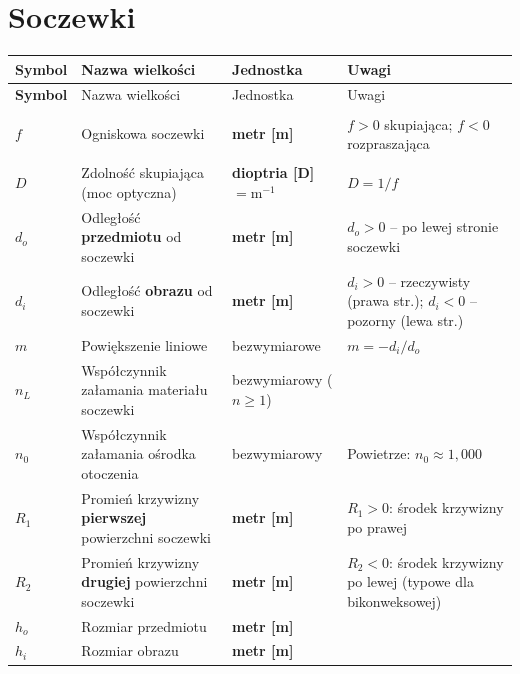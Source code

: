 \documentclass[12pt,a4paper]{article}
\begin{document}
\section{Soczewki}

\begin{longtable}{>{\bfseries}p{1.6cm} p{6.5cm} p{3.2cm} p{3.5cm}}
\toprule
\rowcolor{headercolor}
\color{white}Symbol &
\color{white}Nazwa wielkości &
\color{white}Jednostka &
\color{white}Uwagi \\
\midrule
\endfirsthead
\toprule
\rowcolor{headercolor}
\color{white}Symbol &
\color{white}Nazwa wielkości &
\color{white}Jednostka &
\color{white}Uwagi \\
\midrule
\endhead
\bottomrule
\endfoot

\rowcolor{rowsocz}
$f$     & Ogniskowa soczewki
        & \textbf{metr [m]}
        & $f>0$ skupiająca; $f<0$ rozpraszająca \\

\rowcolor{rowsocz}
$D$     & Zdolność skupiająca (moc optyczna)
        & \textbf{dioptria [D]} $= \mathrm{m}^{-1}$
        & $D = 1/f$ \\

\rowcolor{rowsocz}
$d_o$   & Odległość \textbf{przedmiotu} od soczewki
        & \textbf{metr [m]}
        & $d_o>0$ -- po lewej stronie soczewki \\

\rowcolor{rowsocz}
$d_i$   & Odległość \textbf{obrazu} od soczewki
        & \textbf{metr [m]}
        & $d_i>0$ -- rzeczywisty (prawa str.);
          $d_i<0$ -- pozorny (lewa str.) \\

\rowcolor{rowsocz}
$m$     & Powiększenie liniowe
        & bezwymiarowe
        & $m = -d_i/d_o$ \\

\rowcolor{rowsocz}
$n_L$   & Współczynnik załamania materiału soczewki
        & bezwymiarowy ($n\geq 1$)
        & \\

\rowcolor{rowsocz}
$n_0$   & Współczynnik załamania ośrodka otoczenia
        & bezwymiarowy
        & Powietrze: $n_0\approx 1{,}000$ \\

\rowcolor{rowsocz}
$R_1$   & Promień krzywizny \textbf{pierwszej} powierzchni
          soczewki
        & \textbf{metr [m]}
        & $R_1>0$: środek krzywizny po prawej \\

\rowcolor{rowsocz}
$R_2$   & Promień krzywizny \textbf{drugiej} powierzchni
          soczewki
        & \textbf{metr [m]}
        & $R_2<0$: środek krzywizny po lewej
          (typowe dla bikonweksowej) \\

\rowcolor{rowsocz}
$h_o$   & Rozmiar przedmiotu
        & \textbf{metr [m]}
        & \\

\rowcolor{rowsocz}
$h_i$   & Rozmiar obrazu
        & \textbf{metr [m]}
        & \\

\end{longtable}
\end{document}
